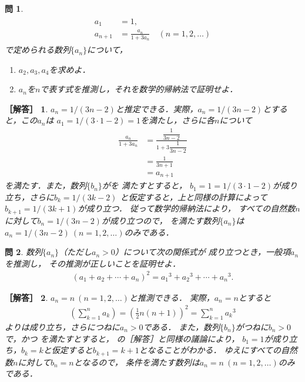 \documentclass[11pt,a4paper]{ltjsarticle} %
\theoremstyle{mystyle} %
\newtheorem{que}{問} %
\newtheorem*{ans}{［解答］} %
\begin{document}
\begin{que} \label{que:suisokuchertkai}
	\begin{align}
		\begin{aligned}
			a_1     & = 1,                                             \\
			a_{n+1} & = \frac{a_n}{1 + 3 a_n} \quad ( n = 1,2,\ldots )
		\end{aligned}
		\label{eq:zenkasikikai}
	\end{align}
	で定められる数列$\{ a_n \}$について，
	\begin{enumerate}
		\item $a_2,a_3,a_4$を求めよ．
		\item $a_n$を$n$で表す式を推測し，それを数学的帰納法で証明せよ．
	\end{enumerate}
\end{que}



\begin{ans}
	$a_n = 1/(3n-2)$と推定できる．実際，$a_n = 1/(3n-2)$とすると，この$a_n$は
	$a_1= 1/(3 \cdot 1 -2) =1$を満たし，さらに各$n$について
	\begin{align*}
		\frac{a_n}{1+ 3 a_n} & =
		\frac{ \dfrac{1}{3n-2} }{ 1+ 3 \dfrac{1}{3n-2} } \\
		                     & = \frac{1}{3n+1}          \\
		                     & = a_{n+1}
	\end{align*}
	を満たす．また，数列$\{ b_n \}$がを
	満たすとすると，
	$b_1 = 1 = 1/(3 \cdot 1 -2)$が成り立ち，さらに$b_k=1/(3k-2)$
	と仮定すると，上と同様の計算によって$b_{k+1} = 1/(3k+1)$が成り立つ．
	従って数学的帰納法により，
	すべての自然数$n$に対して$b_n = 1/(3n-2)$が成り立つので，
	を満たす数列$\{ a_n \}$は
	$a_n = 1/(3n-2) \ (n =1,2, \ldots)$のみである．
\end{ans}

\begin{que} \label{que:suisokuchert2kai}
	数列$\{ a_n \}$（ただし$a_n > 0$）について次の関係式が
	成り立つとき，一般項$a_n$を推測し，
	その推測が正しいことを証明せよ．
	\begin{align}
		( a_1 + a_2 + \cdots + a_n )^2 =
		{a_1} ^3 + {a_2} ^3 + \cdots + {a_n } ^3 .
		\label{eq:suisoku2kai}
	\end{align}
\end{que}


\begin{ans}
	$a_n = n \ (n= 1,2, \ldots)$と推測できる．
	実際，$a_n = n$とすると
	\begin{align*}
		\left( \sum_{k=1}^{n} a_k \right) = \left( \frac{1}{2} n(n+1) \right) ^2
		= \sum_{k=1}^{n} {a_k}^3
	\end{align*}
	よりは成り立ち，さらにつねに$a_n > 0$である．
	また，数列$\{ b_n \}$がつねに$b_n > 0$で，かつ
	を満たすとすると，
	の［解答］と同様の議論により，
	$b_1=1$が成り立ち，$b_k=k$と仮定すると$b_{k+1} = k+1$となることがわかる．
	ゆえにすべての自然数$n$に対して$b_n=n$となるので，
	条件を満たす数列は$a_n = n \ (n=1,2,\ldots)$のみである．
\end{ans}
\end{document}
